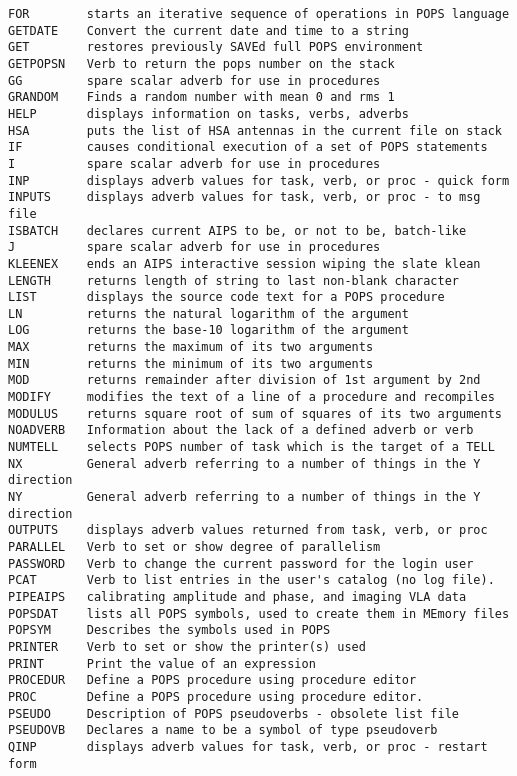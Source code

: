 \begin{verbatim}
FOR        starts an iterative sequence of operations in POPS language
GETDATE    Convert the current date and time to a string
GET        restores previously SAVEd full POPS environment
GETPOPSN   Verb to return the pops number on the stack
GG         spare scalar adverb for use in procedures
GRANDOM    Finds a random number with mean 0 and rms 1
HELP       displays information on tasks, verbs, adverbs
HSA        puts the list of HSA antennas in the current file on stack
IF         causes conditional execution of a set of POPS statements
I          spare scalar adverb for use in procedures
INP        displays adverb values for task, verb, or proc - quick form
INPUTS     displays adverb values for task, verb, or proc - to msg file
ISBATCH    declares current AIPS to be, or not to be, batch-like
J          spare scalar adverb for use in procedures
KLEENEX    ends an AIPS interactive session wiping the slate klean
LENGTH     returns length of string to last non-blank character
LIST       displays the source code text for a POPS procedure
LN         returns the natural logarithm of the argument
LOG        returns the base-10 logarithm of the argument
MAX        returns the maximum of its two arguments
MIN        returns the minimum of its two arguments
MOD        returns remainder after division of 1st argument by 2nd
MODIFY     modifies the text of a line of a procedure and recompiles
MODULUS    returns square root of sum of squares of its two arguments
NOADVERB   Information about the lack of a defined adverb or verb
NUMTELL    selects POPS number of task which is the target of a TELL
NX         General adverb referring to a number of things in the Y direction
NY         General adverb referring to a number of things in the Y direction
OUTPUTS    displays adverb values returned from task, verb, or proc
PARALLEL   Verb to set or show degree of parallelism
PASSWORD   Verb to change the current password for the login user
PCAT       Verb to list entries in the user's catalog (no log file).
PIPEAIPS   calibrating amplitude and phase, and imaging VLA data
POPSDAT    lists all POPS symbols, used to create them in MEmory files
POPSYM     Describes the symbols used in POPS
PRINTER    Verb to set or show the printer(s) used
PRINT      Print the value of an expression
PROCEDUR   Define a POPS procedure using procedure editor
PROC       Define a POPS procedure using procedure editor.
PSEUDO     Description of POPS pseudoverbs - obsolete list file
PSEUDOVB   Declares a name to be a symbol of type pseudoverb
QINP       displays adverb values for task, verb, or proc - restart form

\end{verbatim}

